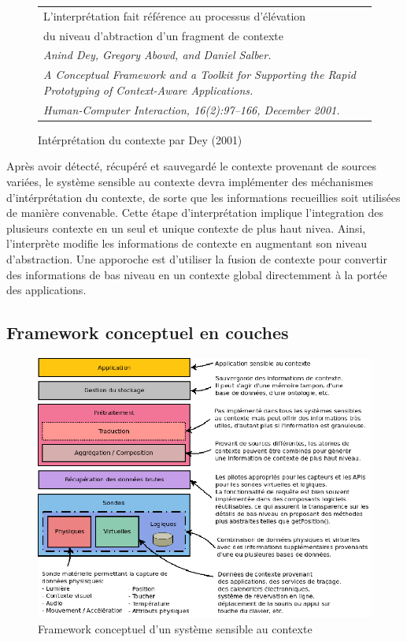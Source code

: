 \begin{figure}[h]
  \centering
  \begin{tabular}{l}
    L'interprétation fait référence au processus d'élévation \\
    du niveau d'abtraction d'un fragment de contexte
    \cite{dey_conceptual_2001} \\
    \em \footnotesize  Anind Dey, Gregory Abowd, and Daniel Salber. \\
    \em \footnotesize A Conceptual Framework and a Toolkit for Supporting the 
    Rapid Prototyping of Context-Aware Applications. \\
    \em \footnotesize Human-Computer Interaction, 16(2):97–166, December 2001. 
  \end{tabular}
  \caption{Intérprétation du contexte par Dey (2001)}
  \label{fig:quote}
\end{figure}

Après avoir détecté, récupéré et sauvegardé le contexte provenant de sources
variées, le système sensible au contexte devra implémenter des méchanismes
d'intérprétation du contexte, de sorte que les informations recueillies soit
utilisées de manière convenable. Cette étape d'interprétation implique
l'integration des plusieurs contexte en un seul et unique contexte de plus haut
nivea. Ainsi, l'interprète modifie les informations de contexte en augmentant
son niveau d'abstraction. Une apporoche est d'utiliser la fusion de contexte
pour convertir des informations de bas niveau en un contexte global directemment
à la portée des applications.

\subsection{Framework conceptuel en couches}

\begin{figure}[H]
  \centering
  \includegraphics[width=\textwidth]{img/layered_conceptual_framework}
  \caption{Framework conceptuel d'un système sensible au contexte}
  \label{archi}
\end{figure}

